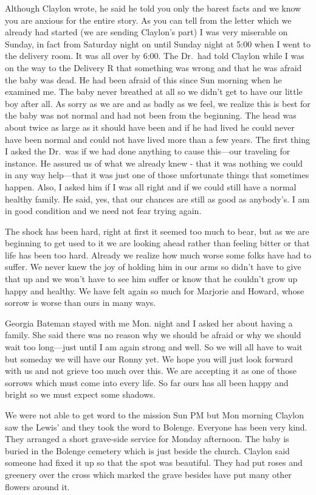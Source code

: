 \documentclass[
]{book}
\begin{document}
Although Claylon wrote, he said he told you only the barest facts and we know you are anxious for the entire story. As you can tell from the letter which we already had started (we are sending Claylon's part) I was very miserable on Sunday, in fact from Saturday night on until Sunday night at 5:00 when I went to the delivery room. It was all over by 6:00. The Dr.~had told Claylon while I was on the way to the Delivery R that something was wrong and that he was afraid the baby was dead. He had been afraid of this since Sun morning when he examined me. The baby never breathed at all so we didn't get to have our little boy after all. As sorry as we are and as badly as we feel, we realize this is best for the baby was not normal and had not been from the beginning. The head was about twice as large as it should have been and if he had lived he could never have been normal and could not have lived more than a few years. The first thing I asked the Dr.~was if we had done anything to cause this---our traveling for instance. He assured us of what we already knew - that it was nothing we could in any way help---that it was just one of those unfortunate things that sometimes happen. Also, I asked him if I was all right and if we could still have a normal healthy family. He said, yes, that our chances are still as good as anybody's. I am in good condition and we need not fear trying again.

The shock has been hard, right at first it seemed too much to bear, but as we are beginning to get used to it we are looking ahead rather than feeling bitter or that life has been too hard. Already we realize how much worse some folks have had to suffer. We never knew the joy of holding him in our arms so didn't have to give that up and we won't have to see him suffer or know that he couldn't grow up happy and healthy. We have felt again so much for Marjorie and Howard, whose sorrow is worse than ours in many ways.

Georgia Bateman stayed with me Mon. night and I asked her about having a family. She said there was no reason why we should be afraid or why we should wait too long---just until I am again strong and well. So we will all have to wait but someday we will have our Ronny yet. We hope you will just look forward with us and not grieve too much over this. We are accepting it as one of those sorrows which must come into every life. So far ours has all been happy and bright so we must expect some shadows.

We were not able to get word to the mission Sun PM but Mon morning Claylon saw the Lewis' and they took the word to Bolenge. Everyone has been very kind. They arranged a short grave-side service for Monday afternoon. The baby is buried in the Bolenge cemetery which is just beside the church. Claylon said someone had fixed it up so that the spot was beautiful. They had put roses and greenery over the cross which marked the grave besides have put many other flowers around it.
\end{document}
